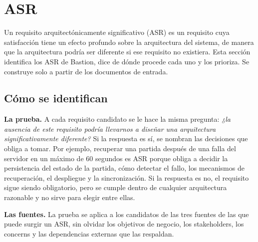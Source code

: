 \section{ASR}\label{sec:asr}

Un requisito arquitectónicamente significativo (ASR) es un requisito cuya satisfacción tiene un efecto profundo sobre la arquitectura del sistema, de manera que la arquitectura podría ser diferente si ese requisito no existiera. Esta sección identifica los ASR de Bastion, dice de dónde procede cada uno y los prioriza. Se construye solo a partir de los documentos de entrada.

\subsection{Cómo se identifican}

\textbf{La prueba.} A cada requisito candidato se le hace la misma pregunta: \emph{¿la ausencia de este requisito podría llevarnos a diseñar una arquitectura significativamente diferente?} Si la respuesta es sí, se nombran las decisiones que obliga a tomar. Por ejemplo, recuperar una partida después de una falla del servidor en un máximo de 60 segundos es ASR porque obliga a decidir la persistencia del estado de la partida, cómo detectar el fallo, los mecanismos de recuperación, el despliegue y la sincronización. Si la respuesta es no, el requisito sigue siendo obligatorio, pero se cumple dentro de cualquier arquitectura razonable y no sirve para elegir entre ellas.

\textbf{Las fuentes.} La prueba se aplica a los candidatos de las tres fuentes de las que puede surgir un ASR, sin olvidar los objetivos de negocio, los stakeholders, los concerns y las dependencias externas que las respaldan.

